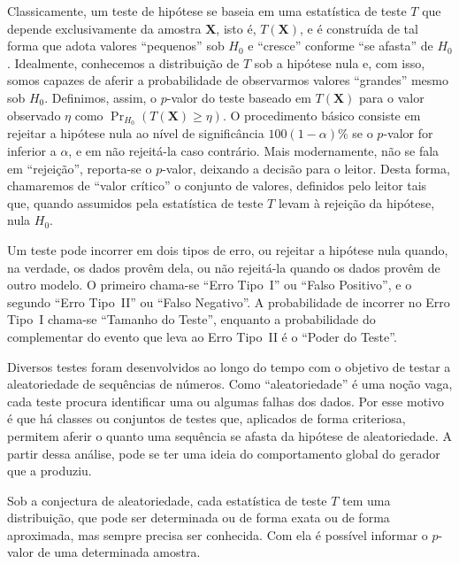 Classicamente, um teste de hipótese se baseia em uma estatística de teste $T$ que depende exclusivamente da amostra $\bm X$, isto é, $T(\bm X)$, e é construída de tal forma que adota valores ``pequenos'' sob $H_0$ e ``cresce'' conforme ``se afasta'' de $H_0$.
Idealmente, conhecemos a distribuição de $T$ sob a hipótese nula e, com isso, somos capazes de aferir a probabilidade de observarmos valores ``grandes'' mesmo sob $H_0$.
Definimos, assim, o $p$-valor do teste baseado em $T(\bm X)$ para o valor observado $\eta$ como $\Pr_{H_0}(T(\bm X) \geq \eta)$.
O procedimento básico consiste em rejeitar a hipótese nula ao nível de significância $100(1-\alpha)\%$ se o $p$-valor for inferior a $\alpha$, e em não rejeitá-la caso contrário.
Mais modernamente, não se fala em ``rejeição'', reporta-se o $p$-valor, deixando a decisão para o leitor. Desta forma, chamaremos de ``valor crítico'' o conjunto de valores, definidos pelo leitor tais que, quando assumidos pela estatística de teste $T$ levam à rejeição da hipótese, nula $H_0$. 

Um teste pode incorrer em dois tipos de erro, ou rejeitar a hipótese nula quando, na verdade, os dados provêm dela, ou não rejeitá-la quando os dados provêm de outro modelo.
O primeiro chama-se ``Erro Tipo~I'' ou ``Falso Positivo'', e o segundo ``Erro Tipo~II'' ou ``Falso Negativo''.
A probabilidade de incorrer no Erro Tipo~I chama-se ``Tamanho do Teste'', enquanto a probabilidade do complementar do evento que leva ao Erro Tipo~II é o ``Poder do Teste''.



Diversos testes foram desenvolvidos ao longo do tempo com o objetivo de testar a aleatoriedade de sequências de números.
Como ``aleatoriedade'' é uma noção vaga, cada teste procura identificar uma ou algumas falhas dos dados.
Por esse motivo é que há classes ou conjuntos de testes que, aplicados de forma criteriosa, permitem aferir o quanto uma sequência se afasta da hipótese de aleatoriedade.
A partir dessa análise, pode se ter uma ideia do comportamento global do gerador que a produziu.

Sob a conjectura de aleatoriedade, cada estatística de teste $T$ tem uma distribuição, que pode ser determinada ou de forma exata ou de forma aproximada, mas sempre precisa ser conhecida.
Com ela é possível informar o $p$-valor de uma determinada amostra.

